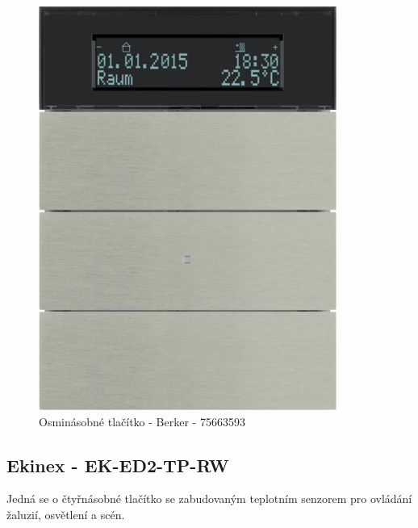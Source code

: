 \begin{figure}[!ht]
  \begin{center}
    \includegraphics[scale=1.3]{obrazky/Berker.jpg}
  \end{center}
  \caption[Osminásobné tlačítko Berker - 75663593 \cite{Berker}]{Osminásobné tlačítko - Berker - 75663593 \cite{Berker}}
  \label{fig:Osminásobné člačítko s termostatem Berker 75663593}
\end{figure}

\subsection{Ekinex - EK-ED2-TP-RW}
Jedná se o čtyřnásobné tlačítko se zabudovaným teplotním senzorem pro ovládání žaluzií, osvětlení a scén. \cite{Ekinex}

